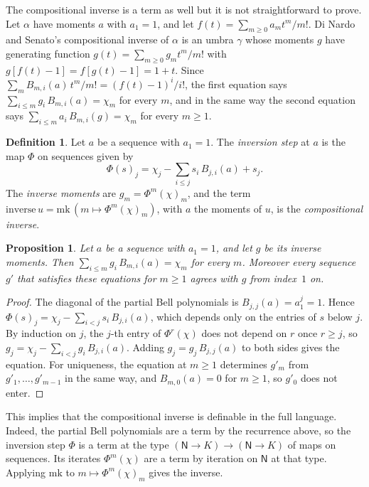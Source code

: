 \documentclass[11pt,a4paper]{report}
\theoremstyle{plain}
\newtheorem{proposition}[theorem]{Proposition}
\theoremstyle{definition}
\newtheorem{definition}[theorem]{Definition}
\theoremstyle{remark}
\newcommand{\Nat}{\mathsf{N}}
\newcommand{\mk}{\mathrm{mk}}
\begin{document}
The compositional inverse is a term as well but it is not straightforward to prove. 
Let $\alpha$ have moments $a$ with $a_1 = 1$, and let $f(t) = \sum_{m \geq 0} a_m t^m / m!$. 
Di Nardo and Senato's compositional inverse of $\alpha$ is an umbra $\gamma$ whose moments $g$ have
generating function $g(t) = \sum_{m \geq 0} g_m t^m / m!$ with
$g[f(t) - 1] = f[g(t) - 1] = 1 + t$. Since
$\sum_{m} B_{m,i}(a)\, t^m / m! = (f(t) - 1)^i / i!$, the first equation says
$\sum_{i \leq m} g_i\, B_{m,i}(a) = \chi_m$ for every $m$, and in the same way the
second equation says $\sum_{i \leq m} a_i\, B_{m,i}(g) = \chi_m$ for every
$m \geq 1$.

\begin{definition}
\label{def:inverse}
Let $a$ be a sequence with $a_1 = 1$. The \emph{inversion step} at $a$ is the
map $\Phi$ on sequences given by
\[
  \Phi(s)_j = \chi_j - \sum_{i \leq j} s_i\, B_{j,i}(a) + s_j .
\]
The \emph{inverse moments} are $g_m = \Phi^m(\chi)_m$, and the term
$\mathrm{inverse}\,u = \mk\,(m \mapsto \Phi^m(\chi)_m)$, with $a$ the moments
of $u$, is the \emph{compositional inverse}.
\end{definition}

\begin{proposition}
\label{prop:inverse}
Let $a$ be a sequence with $a_1 = 1$, and let $g$ be its inverse moments. Then
$\sum_{i \leq m} g_i\, B_{m,i}(a) = \chi_m$ for every $m$. Moreover every sequence
$g'$ that satisfies these equations for $m \geq 1$ agrees with $g$ from index~$1$
on.
\end{proposition}

\begin{proof}
The diagonal of the partial Bell polynomials is $B_{j,j}(a) = a_1^j = 1$. Hence
$\Phi(s)_j = \chi_j - \sum_{i < j} s_i\, B_{j,i}(a)$, which depends only on the
entries of $s$ below $j$. By induction on $j$, the $j$-th entry of $\Phi^r(\chi)$
does not depend on $r$ once $r \geq j$, so $g_j = \chi_j - \sum_{i < j} g_i\,
B_{j,i}(a)$. Adding $g_j = g_j\, B_{j,j}(a)$ to both sides gives the equation.
For uniqueness, the equation at $m \geq 1$ determines $g'_m$ from
$g'_1, \dots, g'_{m-1}$ in the same way, and $B_{m,0}(a) = 0$ for $m \geq 1$, so
$g'_0$ does not enter.
\end{proof}

This implies that the compositional inverse is definable in the full language. Indeed, the
partial Bell polynomials are a term by the recurrence above, so the inversion
step $\Phi$ is a term at the type $(\Nat \to K) \to (\Nat \to K)$ of maps on
sequences. Its iterates $\Phi^m(\chi)$ are a term by iteration on $\Nat$ at that
type. Applying $\mk$ to $m \mapsto \Phi^m(\chi)_m$ gives the inverse. 
\end{document}
